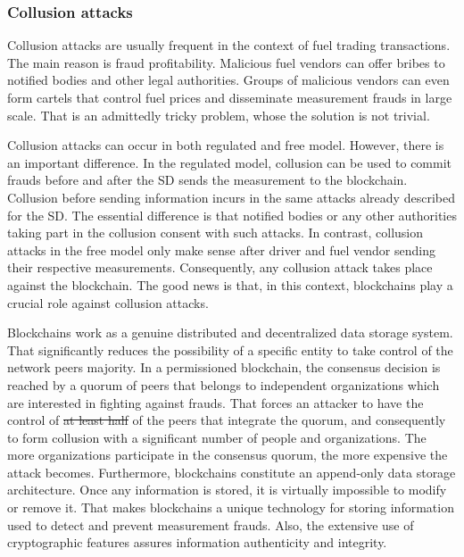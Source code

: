 \documentclass[sigplan]{acmart}
\providecommand{\DIFadd}[1]{{\protect\color{blue}\uwave{#1}}} %
\providecommand{\DIFdel}[1]{{\protect\color{red}\sout{#1}}}                      %
\providecommand{\DIFaddbegin}{} %
\providecommand{\DIFaddend}{} %
\providecommand{\DIFdelbegin}{} %
\providecommand{\DIFdelend}{} %
\begin{document}
\subsubsection{Collusion attacks}
Collusion attacks are usually frequent in the context of fuel trading transactions.
The main reason is fraud profitability.
Malicious fuel vendors can offer bribes to notified bodies and other legal authorities.
Groups of malicious vendors can even form cartels that control fuel prices and disseminate measurement frauds in large scale.
That is an admittedly tricky problem, whose the solution is not trivial.

Collusion attacks can occur in both regulated and free model.
However, there is an important difference.
In the regulated model, collusion can be used to commit frauds before and after the SD sends the measurement to the blockchain.
Collusion before sending information incurs in the same attacks already described for the SD.
The essential difference is that notified bodies or any other authorities taking part in the collusion consent with such attacks.
In contrast, collusion attacks in the free model only make sense after driver and fuel vendor sending their respective measurements.
Consequently, any collusion attack takes place against the blockchain.
The good news is that, in this context, blockchains play a crucial role against collusion attacks.

Blockchains work as a genuine distributed and decentralized data storage system.
That significantly reduces the possibility of a specific entity to take control of the network peers majority. %
In a permissioned blockchain, the consensus decision is reached by a quorum of peers that belongs to independent organizations which are interested in fighting against frauds.
That forces an attacker to have the control of \DIFdelbegin \DIFdel{at least half }\DIFdelend \DIFaddbegin \DIFadd{a significant part }\DIFaddend of the peers that integrate the quorum, and consequently to form collusion with a significant number of people and organizations.
The more organizations participate in the consensus quorum, the more expensive the attack becomes.
Furthermore, blockchains constitute an append-only data storage architecture.
Once any information is stored, it is virtually impossible to modify or remove it.
That makes blockchains a unique technology for storing information used to detect and prevent measurement frauds.
Also, the extensive use of cryptographic features assures information authenticity and integrity.
\end{document}
